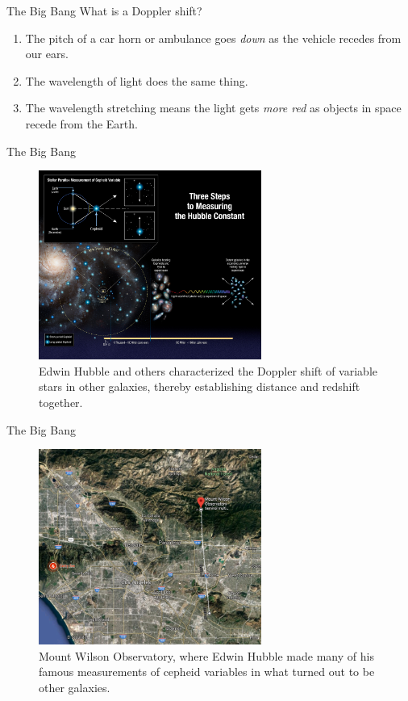 \documentclass{beamer}
\begin{document}
\begin{frame}{The Big Bang}
What is a Doppler shift?
\begin{enumerate}
\item The pitch of a car horn or ambulance goes \textit{down} as the vehicle recedes from our ears.
\item The wavelength of light does the same thing.
\item The wavelength stretching means the light gets \textit{more red} as objects in space recede from the Earth.
\end{enumerate}
\end{frame}

\begin{frame}{The Big Bang}
\begin{figure}
\centering
\includegraphics[width=0.65\textwidth]{threesteps.jpg}
\caption{\label{fig:dropin} Edwin Hubble and others characterized the Doppler shift of variable stars in other galaxies, thereby establishing distance and redshift together.}
\end{figure}
\end{frame}

\begin{frame}{The Big Bang}
\begin{figure}
\centering
\includegraphics[width=0.65\textwidth]{mountwilson.png}
\caption{\label{fig:cmb3} Mount Wilson Observatory, where Edwin Hubble made many of his famous measurements of cepheid variables in what turned out to be other galaxies.}
\end{figure}
\end{frame}
\end{document}
